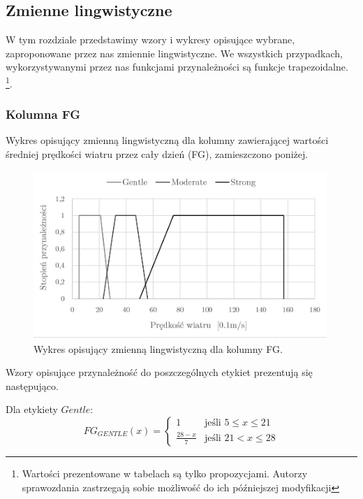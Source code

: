 \documentclass{classrep}
\begin{document}
\subsection{Zmienne lingwistyczne}
W tym rozdziale przedstawimy wzory i wykresy opisujące wybrane, zaproponowane przez nas zmiennie lingwistyczne. We wszystkich przypadkach, wykorzystywanymi przez nas funkcjami przynależności są funkcje trapezoidalne.  \footnote{Wartości prezentowane w tabelach są tylko propozycjami. Autorzy sprawozdania zastrzegają sobie możliwość do ich późniejszej modyfikacji}.\newline

\clearpage



\subsubsection{Kolumna FG}
Wykres opisujący zmienną lingwistyczną dla kolumny zawierającej wartości średniej prędkości wiatru przez cały dzień (FG), zamieszczono poniżej.
\begin{figure}[H]
	\centering
	\includegraphics[width=0.99\textwidth]{Pictures/TermsCharts/FG.png}
	\caption{Wykres opisujący zmienną lingwistyczną dla kolumny FG.}
\end{figure}

Wzory opisujące przynależność do poszczególnych etykiet prezentują się następująco. \newline

Dla etykiety $Gentle$:
\begin{equation}
{FG}_{GENTLE}(x)= \left\{ \begin{array}{ll}
1 			& \textrm{jeśli $5 \leq x \leq 21$} \\
\frac{28-x}{7} 	& \textrm{jeśli $21 < x \leq 28$}
\end{array} \right.
\end{equation}
\end{document}
